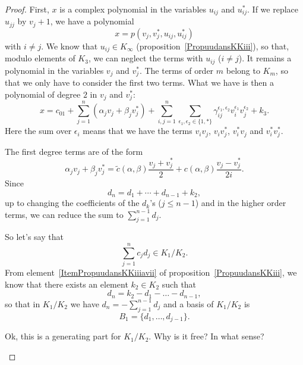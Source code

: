 \begin{proof}
    First, $x$ is a complex polynomial in the variables $u_{ij}$ and $u_{ij}^*$. If we replace $u_{jj}$ by $v_j+1$, we have a polynomial
    \begin{equation}
        x=p(v_j,v_j^*,u_{ij},u_{ij}^*)
    \end{equation}
    with $i\neq j$. We know that $u_{ij}\in K_{\infty}$ (proposition~\ref{PropuudansKKiii}), so that, modulo elements of $K_3$, we can neglect the terms with $u_{ij}$ ($i\neq j$). It remains a polynomial in the variables $v_j$ and $v_j^*$. The terms of order $m$ belong to $K_m$, so that we only have to consider the first two terms. What we have is then a polynomial of degree $2$ in $v_j$ and $v_j^*$:
    \begin{equation}        \label{EqxSumvvdgammaUn}
        x=c_01+\sum_{j=1}^n(\alpha_jv_j+\beta_jv_j^*)+\sum_{i,j=1}^n\sum_{\epsilon_1,\epsilon_2\in\{ 1,* \}}\gamma_{ij}^{\epsilon_1,\epsilon_2}v_i^{\epsilon_1}v_j^{\epsilon_2}+k_3.
    \end{equation}
    Here the sum over $\epsilon_i$ means that we have the terms $v_iv_j$, $v_iv_j^*$, $v_i^*v_j$ and $v_i^*v_j^*$.

    The first degree terms are of the form
    \begin{equation}
        \alpha_j v_j+\beta_jv^*_j=\tilde c(\alpha,\beta)\frac{ v_j+v_j^* }{ 2 }+c(\alpha,\beta)\frac{ v_j-v_j^* }{ 2i }.
    \end{equation}
    Since
    \begin{equation}
        d_n=d_1+\cdots+d_{n-1}+k_2,
    \end{equation}
    up to changing the coefficients of the $d_k$'s ($j\leq n-1$) and in the higher order terms, we can reduce the sum to $\sum_{j=1}^{n-1}d_j$.


    So let's say that
    \begin{equation}
        \sum_{j=1}^n c_jd_j\in K_1/K_2.
    \end{equation}
    From element~\ref{ItemPropuudansKKiiiavii} of proposition~\ref{PropuudansKKiii}, we know that there exists an element $k_2\in K_2$ such that
    \begin{equation}
        d_n=k_2-d_1-\ldots -d_{n-1},
    \end{equation}
    so that in $K_1/K_2$ we have $d_n=-\sum_{j=1}^{n-1}d_j$ and a basis of $K_1/K_2$ is
    \begin{equation}
        B_1=\{ d_1,\ldots,d_{j-1} \}.
    \end{equation}
    \begin{probleme}
        Ok, this is a generating part for $K_1/K_2$. Why is it free? In what sense?
    \end{probleme}


\end{proof}
